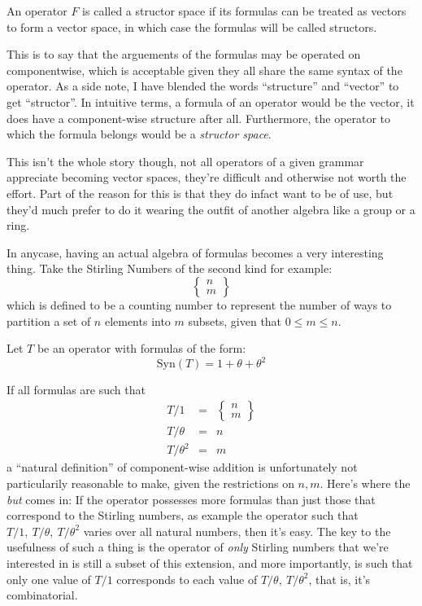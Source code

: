 \documentclass[twoside]{article}
\newenvironment{definition}[1][Definition]{\begin{trivlist}
\item[\hskip \labelsep {\bfseries #1}]}{\end{trivlist}}
\begin{document}
\begin{definition}[Structor Space]

An operator $ F $ is called a structor space if its formulas can be treated as vectors to form a vector space,
in which case the formulas will be called structors.

\end{definition}
This is to say that the arguements of the formulas may be operated on componentwise, which is acceptable given they
all share the same syntax of the operator.  As a side note, I have blended the words ``structure'' and ``vector''
to get ``structor''.  In intuitive terms, a formula of an operator would be the vector, it does have a
component-wise structure after all.  Furthermore, the operator to which the formula belongs would be a
\emph{structor space}.  

This isn't the whole story though, not all operators of a given grammar appreciate becoming vector spaces, they're
difficult and otherwise not worth the effort.  Part of the reason for this is that they do infact want to be of use,
but they'd much prefer to do it wearing the outfit of another algebra like a group or a ring.

In anycase, having an actual algebra of formulas becomes a very interesting thing.
Take the Stirling Numbers of the second kind for example:
$$ \left\{ \!\!\!\begin{array}{c} n \\ m \end{array}\!\!\!\right\} $$
which is defined to be a counting number to represent the number of ways to partition a set of $ n $ elements
into $ m $ subsets, given that $ 0\le m\le n $.

Let $ T $ be an operator with formulas of the form:
$$ \mbox{Syn}(T)=1+\theta+\theta^2 $$

If all formulas are such that
\begin{eqnarray*}
T/1 & = & \left\{ \!\!\!\begin{array}{c} n \\ m \end{array}\!\!\!\right\} \\
T/\theta & = & n \\
T/\theta^2 & = & m
\end{eqnarray*}
a ``natural definition'' of component-wise addition is unfortunately not particularily reasonable to make, given
the restrictions on $ n, m $.  Here's where the \emph{but} comes in:  If the operator possesses more formulas than
just those that correspond to the Stirling numbers, as example the operator such that $ T/1,\ T/\theta,\ T/\theta^2 $
varies over all natural numbers, then it's easy.  The key to the usefulness of such a thing is the operator of
\emph{only} Stirling numbers that we're interested in is still a subset of this extension, and more importantly, is
such that only one value of $ T/1 $ corresponds to each value of $ T/\theta,\ T/\theta^2 $, that is, it's combinatorial.
\end{document}
